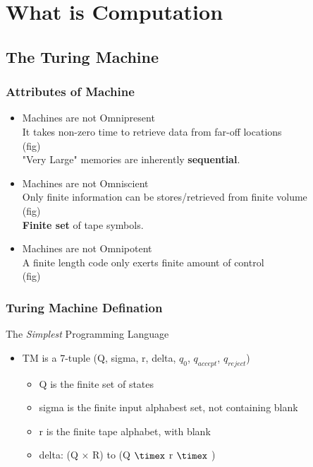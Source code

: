 \chapter{What is Computation}

\section{The Turing Machine}

\subsection{Attributes of \textbf{Machine}}

\begin{itemize}
    \item Machines are not Omnipresent\\
        It takes non-zero time to retrieve data from far-off locations\\

        (fig)\\

        "Very Large" memories are inherently \textbf{sequential}.
    \item Machines are not Omniscient\\
        Only finite information can be stores/retrieved from finite volume\\

        (fig)\\

        \textbf{Finite set} of tape symbols.
    \item Machines are not Omnipotent\\
        A finite length code only exerts finite amount of control\\

        (fig)
\end{itemize}

\subsection{Turing Machine Defination}

The \textit{Simplest} Programming Language\\

\begin{itemize}
    \item TM is a 7-tuple (Q, sigma, r, delta, $q_0$, $q_{accept}$,
        $q_{reject}$)
        \begin{itemize}
            \item Q is the finite set of states
            \item sigma is the finite input alphabest set, not containing
                blank
            \item r is the finite tape alphabet, with blank
            \item delta: (Q $\times$ R) to (Q $\timex$ r $\timex$ )
        \end{itemize}
\end{itemize}

